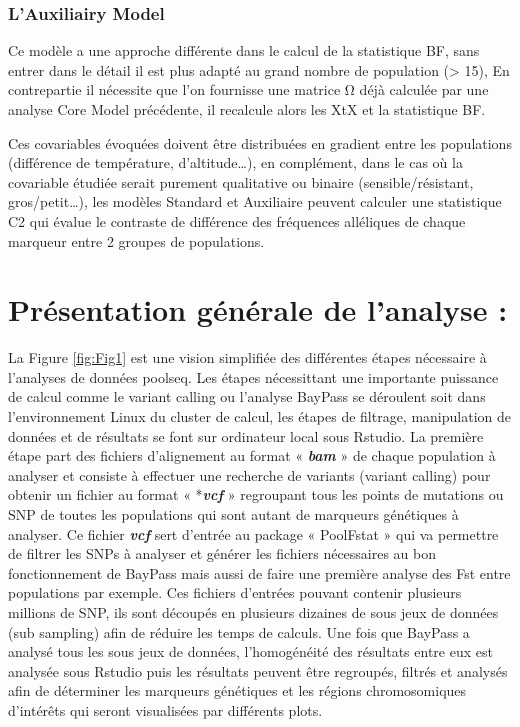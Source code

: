 \documentclass[
  openany]{book}
\theoremstyle{definition}
\theoremstyle{definition}
\theoremstyle{definition}
\theoremstyle{definition}
\theoremstyle{remark}
\begin{document}
\hypertarget{lauxiliairy-model}{%
\subsubsection*{L'Auxiliairy Model}\label{lauxiliairy-model}}

Ce modèle a une approche différente dans le calcul de la statistique BF, sans entrer dans le détail il est plus adapté au grand nombre de population (\textgreater{} 15), En contrepartie il nécessite que l'on fournisse une matrice Ω déjà calculée par une analyse Core Model précédente, il recalcule alors les XtX et la statistique BF.

Ces covariables évoquées doivent être distribuées en gradient entre les populations (différence de température, d'altitude\ldots), en complément, dans le cas où la covariable étudiée serait purement qualitative ou binaire (sensible/résistant, gros/petit\ldots), les modèles Standard et Auxiliaire peuvent calculer une statistique C2 qui évalue le contraste de différence des fréquences alléliques de chaque marqueur entre 2 groupes de populations.

\hypertarget{pruxe9sentation-guxe9nuxe9rale-de-lanalyse}{%
\section*{Présentation générale de l'analyse :}\label{pruxe9sentation-guxe9nuxe9rale-de-lanalyse}}

La Figure \ref{fig:Fig1} est une vision simplifiée des différentes étapes nécessaire à l'analyses de données poolseq. Les étapes nécessittant une importante puissance de calcul comme le variant calling ou l'analyse BayPass se déroulent soit dans l'environnement Linux du cluster de calcul, les étapes de filtrage, manipulation de données et de résultats se font sur ordinateur local sous Rstudio.
La première étape part des fichiers d'alignement au format « \textbf{\emph{bam}} » de chaque population à analyser et consiste à effectuer une recherche de variants (variant calling) pour obtenir un fichier au format « *\textbf{\emph{vcf}} » regroupant tous les points de mutations ou SNP de toutes les populations qui sont autant de marqueurs génétiques à analyser. Ce fichier \textbf{\emph{vcf}} sert d'entrée au package « PoolFstat » \citep{gautier_f-statistics_2022} qui va permettre de filtrer les SNPs à analyser et générer les fichiers nécessaires au bon fonctionnement de BayPass mais aussi de faire une première analyse des Fst entre populations par exemple. Ces fichiers d'entrées pouvant contenir plusieurs millions de SNP, ils sont découpés en plusieurs dizaines de sous jeux de données (sub sampling) afin de réduire les temps de calculs. Une fois que BayPass a analysé tous les sous jeux de données, l'homogénéité des résultats entre eux est analysée sous Rstudio puis les résultats peuvent être regroupés, filtrés et analysés afin de déterminer les marqueurs génétiques et les régions chromosomiques d'intérêts qui seront visualisées par différents plots.
\end{document}
